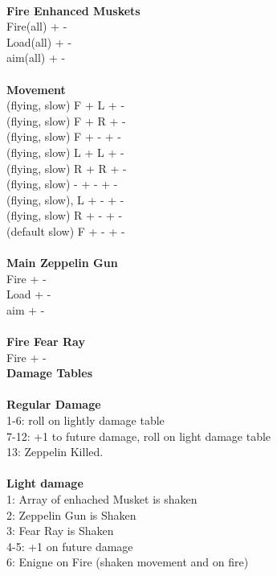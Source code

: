 \ \\ {\bf Fire Enhanced Muskets } \\
Fire(all) + - \\
Load(all) + - \\
aim(all) + - \\
\ \\ {\bf Movement } \\
(flying, slow) F + L + - \\
(flying, slow) F + R + - \\
(flying, slow) F + - + - \\
(flying, slow) L + L + - \\
(flying, slow) R + R + - \\
(flying, slow) - + - + - \\
(flying, slow), L + - + -  \\
(flying, slow) R + - + -  \\
(default slow) F + - + - \\
\ \\ {\bf Main Zeppelin Gun } \\
Fire + - \\
Load + - \\
aim + - \\
\ \\ {\bf Fire Fear Ray } \\
Fire + - \\



{\bf Damage Tables} \\
\ \\ {\bf Regular Damage } \\
1-6: roll on lightly damage table \\
7-12: +1 to future damage, roll on light damage table \\
13: Zeppelin Killed. \\
\ \\ {\bf Light damage } \\
1: Array of enhached Musket is shaken \\
2: Zeppelin Gun is Shaken \\
3: Fear Ray is Shaken \\
4-5: +1 on future damage \\
6: Enigne on Fire (shaken movement and on fire) \\










